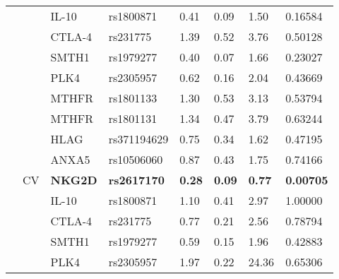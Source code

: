 \begin{table}[!ht]
\begin{tabular}{llllllll}
&  & IL-10          & rs1800871          & 0.41   & 0.09          & 1.50          & 0.16584   \\ \cline{3-8} 
&  & CTLA-4  & rs231775 & 1.39          & 0.52  & 3.76  & 0.50128     \\ \cline{3-8} 
&   & SMTH1  & rs1979277          & 0.40    & 0.07          & 1.66          & 0.23027  \\ \cline{3-8} 
&   & PLK4   & rs2305957     & 0.62          & 0.16  & 2.04     & 0.43669          \\ \hline
\multirow{9}{*}{} & \multirow{9}{*}{CV}  & MTHFR & rs1801133  & 1.30 & 0.53   & 3.13  & 0.53794          \\ \cline{3-8} 
 &   & MTHFR  & rs1801131  & 1.34          & 0.47   & 3.79  & 0.63244          \\ \cline{3-8} 
&  & HLAG  & rs371194629 & 0.75  & 0.34    & 1.62  & 0.47195  \\ \cline{3-8} 
  &  & ANXA5 & rs10506060         & 0.87   & 0.43 & 1.75          & 0.74166 \\ \cline{3-8} 
&  & \textbf{NKG2D} & \textbf{rs2617170} & \textbf{0.28} & \textbf{0.09} & \textbf{0.77} & \textbf{0.00705} \\ \cline{3-8} 
 &  & IL-10          & rs1800871          & 1.10  & 0.41          & 2.97          & 1.00000     \\ \cline{3-8} 
 &   & CTLA-4         & rs231775           & 0.77          & 0.21          & 2.56     & 0.78794          \\ \cline{3-8} 
 &  & SMTH1          & rs1979277          & 0.59  & 0.15          & 1.96          & 0.42883 \\ \cline{3-8} 
 &  & PLK4 & rs2305957  & 1.97 & 0.22 & 24.36 & 0.65306          \\ \hline
\end{tabular}
\label{tab:tab:Model genetic analysis in WBC and CV}
\end{table}

